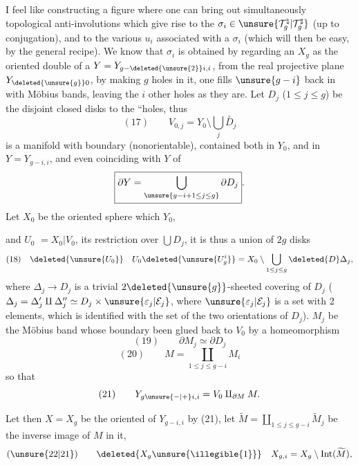 I feel like constructing a  figure where
one can bring out simultaneously
topological anti-involutions
which  give rise to the
$\sigma_i\in\unsure{\mathcal{T}_g^{\natural}|\mathcal{T}_g^{\sharp}}$ (up to conjugation), and to the various
$u_i$  associated with a $\sigma_i$ (which will then be
easy, by the general recipe). We
know that $\sigma_i$  is obtained by regarding
an $X_g$ as the oriented double
of a $Y=Y_{g-\deleted{\unsure{2}}i,i}$, 
from the  real projective plane $Y_{\deleted{\unsure{g}}0}$, by
making $g$ holes in it,  one  fills
$\unsure{g-i}$ back in with Möbius bands,
leaving the $i$ other holes as they are.
Let $D_j$ ($1\le j\le g$) be the disjoint
closed disks  to the ``holes, thus
\[
(17)\qquad \boxed{V_{0,j}=Y_0\setminus\bigcup_j \overset{\circ}{D}_j}
\]
is a manifold with boundary
(nonorientable), contained both in
$Y_0$, and in $Y=Y_{g-i,i}$, and even
coinciding with $Y$  of
\[
\boxed{\partial Y=\bigcup_{\unsure{g-i+1\le j\le g}}\partial D_j}.
\]
 Let $X_0$ be the oriented sphere which  $Y_0$,

and $U_0$  $=X_0\vert V_0$, its restriction over $\bigcup D_j$,
it is thus  a union of $2g$ disks
\[
(18)\quad \deleted{\unsure{U_0}}\quad U_0\deleted{\unsure{U_g^i}}=X_0\setminus\bigcup_{1\le j\le g}\deleted{D}\Delta_j,
\]
where $\Delta_j\longrightarrow D_j$ is a trivial $2\deleted{\unsure{g}}$-sheeted
covering of $D_j$ ($\Delta_j=\Delta'_j\amalg\Delta''_j\simeq D_j\times\unsure{\varepsilon_j|\mathcal{E}_j}$,
where $\unsure{\varepsilon_j|\mathcal{E}_j}$ is a set with 2 elements, which is identified
with the set of the two orientations of
$D_j$). 
 $M_j$  be the Möbius band whose boundary 
been glued back to $V_0$ by a homeomorphism
\[
(19)\qquad \partial M_j\simeq\partial D_j
\]
\[
(20)\qquad M=\coprod_{1\le j\le g-i} M_i
\]
so that
\[
(21)\qquad Y_{g\unsure{-|+}i,i}=V_0\amalg_{\partial M}M.
\]


Let then $X=X_g$ be the oriented 
of $Y_{g-i,i}$  by (21), let $\widetilde M=\coprod_{1\le j\le g-i}\widetilde M_j$
be the inverse image of $M$ in it, 
 
\[
(\unsure{22|21})\qquad \deleted{X_g\unsure{\illegible{1}}}\quad X_{g,i}=X_g\setminus\operatorname{Int}(\widetilde M),
\]